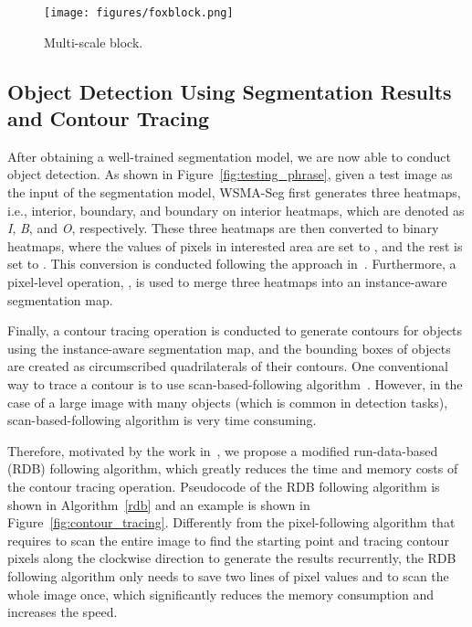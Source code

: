 \documentclass{article}
\begin{document}
\begin{figure}
  \centering
  \texttt{[image: figures/foxblock.png]}
  \caption{Multi-scale block.\label{fig:fox_block}}
\end{figure}



\subsection{Object Detection Using Segmentation Results and Contour Tracing}

After obtaining a well-trained segmentation model, we are now able to conduct object detection. As shown in Figure~\ref{fig:testing_phrase}, given a test image as the input of the segmentation model, WSMA-Seg first generates three heatmaps, i.e., interior, boundary, and boundary on interior heatmaps, which are denoted as \emph{I}, \emph{B}, and \emph{O}, respectively. These three heatmaps are then converted to binary heatmaps, where the values of pixels in interested area are set to , and the rest is set to . This conversion is conducted following the approach  in~\cite{suzuki1985topological}. Furthermore, a pixel-level operation, , is used to merge three heatmaps into an instance-aware segmentation map. 

Finally, a contour tracing operation is conducted to generate contours for objects using the instance-aware segmentation map, and the bounding boxes of objects are created as circumscribed quadrilaterals of their contours. One conventional way to trace a contour is to use scan-based-following algorithm~\cite{suzuki1985topological}. However, in the case of a large image with many objects (which is common in detection tasks), scan-based-following algorithm is very time consuming.

Therefore, motivated by the work in~\cite{agrawala1977sequential}, we propose a modified run-data-based (RDB) following algorithm, which greatly reduces the time and memory costs of the contour tracing operation. 
Pseudocode of the RDB following algorithm is shown in Algorithm~\ref{rdb} and an example is shown in Figure~\ref{fig:contour_tracing}. Differently from the pixel-following algorithm that requires to scan the entire image to find the starting point and tracing contour pixels along the clockwise direction to generate the results recurrently, the RDB following algorithm only needs to save two lines of pixel values and to scan the whole image once, which significantly reduces the memory consumption and increases the speed.
\end{document}
